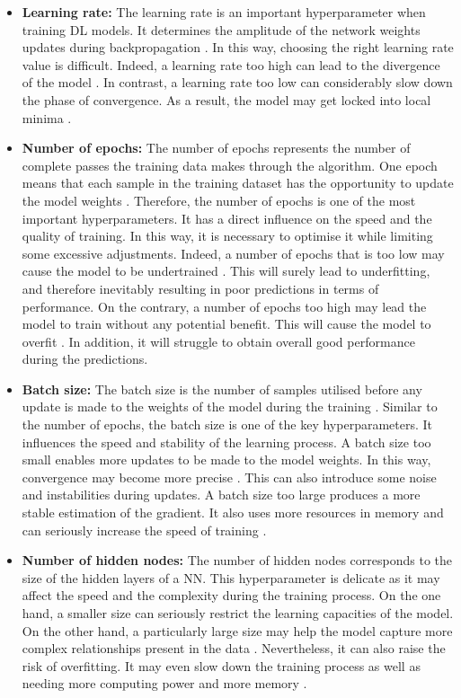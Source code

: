 \documentclass[12pt,oneside]{book} %
\begin{document}
\begin{itemize}
    \item \textbf{Learning rate:} The learning rate is an important hyperparameter when training DL models. It determines the amplitude of the network weights updates during backpropagation \cite{learning_rate}. In this way, choosing the right learning rate value is difficult. Indeed, a learning rate too high can lead to the divergence of the model \cite{learning_rate1}. In contrast, a learning rate too low can considerably slow down the phase of convergence. As a result, the model may get locked into local minima \cite{learning_rate1}.
    \item \textbf{Number of epochs:}  The number of epochs represents the number of complete passes the training data makes through the algorithm. \citep{Epochs_batch,Epochs_batch1} One epoch means that each sample in the training dataset has the opportunity to update the model weights \citep{Epochs_batch,Epochs_batch1}. Therefore, the number of epochs is one of the most important hyperparameters. It has a direct influence on the speed and the quality of training. In this way, it is necessary to optimise it while limiting some excessive adjustments. Indeed, a number of epochs that is too low may cause the model to be undertrained \cite{Epochs_batch1}. This will surely lead to underfitting, and therefore inevitably resulting in poor predictions in terms of performance. On the contrary, a number of epochs too high may lead the model to train without any potential benefit. This will cause the model to overfit \cite{Epochs_batch1}. In addition, it will struggle to obtain overall good performance during the predictions.
    \item \textbf{Batch size:} The batch size is the number of samples utilised before any update is made to the weights of the model during the training \citep{Epochs_batch,Epochs_batch1}. Similar to the number of epochs, the batch size is one of the key hyperparameters. It influences the speed and stability of the learning process. A batch size too small enables more updates to be made to the model weights. In this way, convergence may become more precise \cite{Epochs_batch2}. This can also introduce some noise and instabilities during updates. A batch size too large produces a more stable estimation of the gradient. It also uses more resources in memory and can seriously increase the speed of training \cite{Epochs_batch2}.
    \item \textbf{Number of hidden nodes:} The number of hidden nodes corresponds to the size of the hidden layers of a NN. This hyperparameter is delicate as it may affect the speed and the complexity during the training process. On the one hand, a smaller size can seriously restrict the learning capacities of the model. On the other hand, a particularly large size may help the model capture more complex relationships present in the data \cite{Hyperparameters1}. Nevertheless, it can also raise the risk of overfitting. It may even slow down the training process as well as needing more computing power and more memory \cite{Hyperparameters1}. 

\end{itemize}
\end{document}
